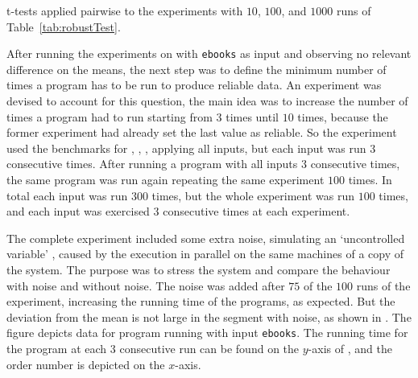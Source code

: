 \begin{table}
  \centering
  \begin{tiny}
  
  \end{tiny}
  \caption{t-tests applied pairwise to the experiments with $10$, $100$, and $1000$ runs of Table~\ref{tab:robustTest}.}
  \label{tab:ttest}
\end{table}


After running the experiments on \bzip with {\tt ebooks} as input and observing no relevant difference on the means, the next step was to define the minimum number of times a program has to be run to produce reliable data. An experiment was devised to account for this question, the main idea was to increase the number of times a program had to run starting from $3$ times until $10$ times, because the former experiment had already set the last value as reliable. So the experiment used the benchmarks for \bzip, \gzip, \gcc, \gobmk applying all inputs, but each input was run $3$ consecutive times. After running a program with all inputs $3$ consecutive times, the same program was run again repeating the same experiment $100$ times. In total each input was run $300$ times, but the whole experiment was run $100$ times, and each input was exercised $3$ consecutive times at each experiment.

The complete experiment included some extra noise, simulating an `uncontrolled variable' \cite{Kalibera2013}, caused by the execution in parallel on the same machines of a copy of the system. The purpose was to stress the system and compare the behaviour with noise and without noise. The noise was added after $75$ of the $100$ runs of the experiment, increasing the running time of the programs, as expected. But the deviation from the mean is not large in the segment with noise, as shown in . The figure depicts data for program \bzip running with input {\tt ebooks}. The running time for the program at each $3$ consecutive run can be found on the $y$-axis of , and the order number is depicted on the $x$-axis.

